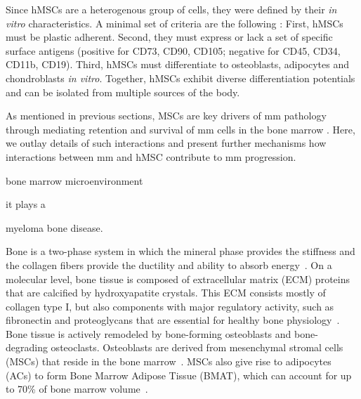 Since hMSCs are a heterogenous group of cells, they were defined by their
\textit{in vitro} characteristics. A minimal set of criteria are the following
\cite{dominiciMinimalCriteriaDefining2006}: First, hMSCs must be plastic
adherent. Second, they must express or lack a set of specific surface antigens
(positive for CD73, CD90, CD105; negative for CD45, CD34, CD11b, CD19). Third,
hMSCs must differentiate to osteoblasts, adipocytes and chondroblasts \textit{in
    vitro}. Together, hMSCs exhibit diverse differentiation potentials and can be
isolated from multiple sources of the body.




\label{sec:intro_myeloma_hMSC}
As mentioned in previous sections, MSCs are key drivers of \ac{mm} pathology through
mediating retention and survival of \ac{mm} cells in the bone marrow
\cite{mangoliniBoneMarrowStromal2020}. Here, we outlay details of such
interactions and present further mechanisms how interactions between \ac{mm} and hMSC
contribute to \ac{mm} progression.

bone marrow microenvironment



it plays a

myeloma bone disease.

Bone is a two-phase system in which the mineral phase provides the stiffness and
the collagen fibers provide the ductility and ability to absorb
energy~\cite{viguet-carrinRoleCollagenBone2006}. On a molecular level, bone
tissue is composed of extracellular matrix (ECM) proteins that are calcified by
hydroxyapatite crystals. This ECM consists mostly of collagen type I, but also
components with major regulatory activity, such as fibronectin and proteoglycans
that are essential for healthy bone
physiology~\cite{alcorta-sevillanoDecipheringRelevanceBone2020}. Bone tissue is
actively remodeled by bone-forming osteoblasts and bone-degrading osteoclasts.
Osteoblasts are derived from mesenchymal stromal cells (MSCs) that reside in the
bone marrow~\cite{friedensteinOsteogenesisTransplantsBone1966,
    pittengerMultilineagePotentialAdult1999}. MSCs also give rise to adipocytes
(ACs) to form Bone Marrow Adipose Tissue (BMAT), which can account for up to
70\% of bone marrow volume~\cite{fazeliMarrowFatBone2013}.

